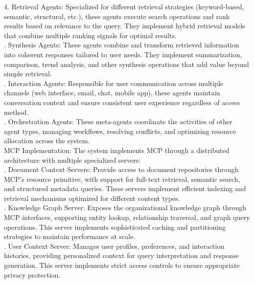 4. Retrieval Agents: Specialized for different retrieval strategies (keyword-based, semantic, structural, etc.), these agents execute search operations and rank results based on relevance to the query. They implement hybrid retrieval models that combine multiple ranking signals for optimal results.\\ . Synthesis Agents: These agents combine and transform retrieved information into coherent responses tailored to user needs. They implement summarization, comparison, trend analysis, and other synthesis operations that add value beyond simple retrieval.\\ . Interaction Agents: Responsible for user communication across multiple channels (web interface, email, chat, mobile app), these agents maintain conversation context and ensure consistent user experience regardless of access method.\\ . Orchestration Agents: These meta-agents coordinate the activities of other agent types, managing workflows, resolving conflicts, and optimizing resource allocation across the system.\\ \newline
MCP Implementation: The system implements MCP through a distributed architecture with multiple specialized servers:\\ . Document Context Servers: Provide access to document repositories through MCP's resource primitive, with support for full-text retrieval, semantic search, and structured metadata queries. These servers implement efficient indexing and retrieval mechanisms optimized for different content types.\\ . Knowledge Graph Server: Exposes the organizational knowledge graph through MCP interfaces, supporting entity lookup, relationship traversal, and graph query operations. This server implements sophisticated caching and partitioning strategies to maintain performance at scale.\\ . User Context Server: Manages user profiles, preferences, and interaction histories, providing personalized context for query interpretation and response generation. This server implements strict access controls to ensure appropriate privacy protection.\\ \newline
